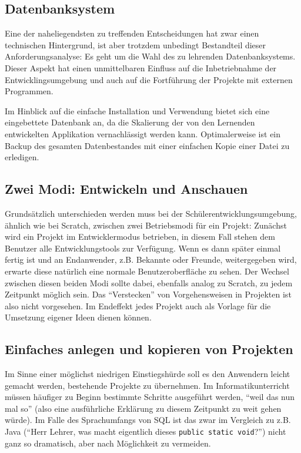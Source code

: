 \subsection{Datenbanksystem}

Eine der naheliegendsten zu treffenden Entscheidungen hat zwar einen technischen Hintergrund, ist aber trotzdem unbedingt Bestandteil dieser Anforderungsanalyse: Es geht um die Wahl des zu lehrenden Datenbanksystems. Dieser Aspekt hat einen unmittelbaren Einfluss auf die Inbetriebnahme der Entwicklingsumgebung und auch auf die Fortführung der Projekte mit externen Programmen.

Im Hinblick auf die einfache Installation und Verwendung bietet sich eine eingebettete Datenbank an, da die Skalierung der von den Lernenden entwickelten Applikation vernachlässigt werden kann. Optimalerweise ist ein Backup des gesamten Datenbestandes mit einer einfachen Kopie einer Datei zu erledigen.


\subsection{Zwei Modi: Entwickeln und Anschauen}

Grundsätzlich unterschieden werden muss bei der Schülerentwicklungsumgebung, ähnlich wie bei Scratch, zwischen zwei Betriebsmodi für ein Projekt: Zunächst wird ein Projekt im Entwicklermodus betrieben, in diesem Fall stehen dem Benutzer alle Entwicklungstools zur Verfügung. Wenn es dann später einmal fertig ist und an Endanwender, z.B. Bekannte oder Freunde, weitergegeben wird, erwarte diese natürlich eine normale Benutzeroberfläche zu sehen. Der Wechsel zwischen diesen beiden Modi sollte dabei, ebenfalls analog zu Scratch, zu jedem Zeitpunkt möglich sein. Das ``Verstecken'' von Vorgehensweisen in Projekten ist also nicht vorgesehen. Im Endeffekt jedes Projekt auch als Vorlage für die Umsetzung eigener Ideen dienen können.

\subsection{Einfaches anlegen und kopieren von Projekten}

Im Sinne einer möglichst niedrigen Einstiegshürde soll es den Anwendern leicht gemacht werden, bestehende Projekte zu übernehmen. Im Informatikunterricht müssen häufiger zu Beginn bestimmte Schritte ausgeführt werden, ``weil das nun mal so'' (also eine ausführliche Erklärung zu diesem Zeitpunkt zu weit gehen würde). Im Falle des Sprachumfangs von SQL ist das zwar im Vergleich zu z.B. Java (``Herr Lehrer, was macht eigentlich dieses \texttt{public static void}?'') nicht ganz so dramatisch, aber nach Möglichkeit zu vermeiden.


